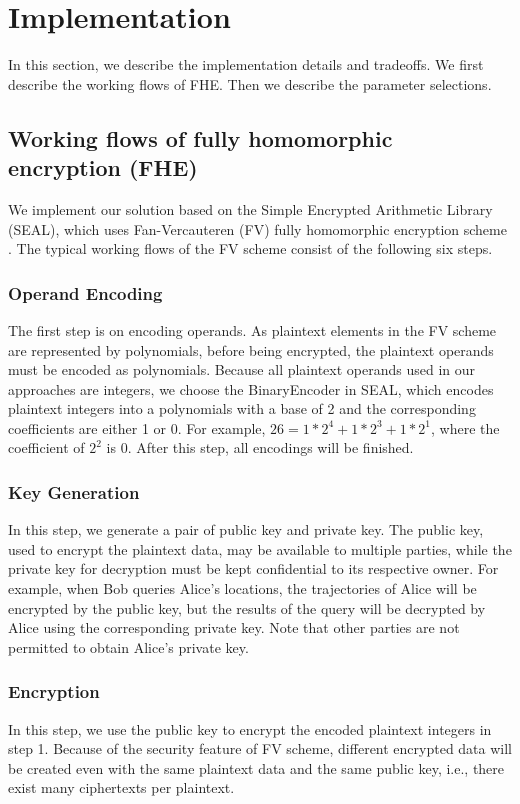 \section{Implementation}
\label{sec:implementation}

In this section, we describe the implementation details and tradeoffs. We first describe the working flows of FHE. Then we describe the parameter selections.

\subsection{Working flows of fully homomorphic encryption (FHE)}

We implement our solution based on the Simple Encrypted Arithmetic Library (SEAL), which uses Fan-Vercauteren (FV) fully homomorphic encryption scheme \cite{fan2012somewhat}. The typical working flows of the FV scheme consist of the following six steps.

\subsubsection{Operand Encoding}

The first step is on encoding operands. As plaintext elements in the FV scheme are represented by polynomials, before being encrypted, the plaintext operands must be encoded as polynomials. Because all plaintext operands used in our approaches are integers, we choose the BinaryEncoder in SEAL, which encodes plaintext integers into a polynomials with a base of 2 and the corresponding coefficients are either 1 or 0.  For example, $26 = 1*2^{4} + 1*2^{3} + 1*2^{1}$, where the coefficient of $2^2$ is 0. After this step, all encodings will be finished.

\subsubsection{Key Generation}
In this step, we generate a pair of public key and private key. The public key, used to encrypt the plaintext data, may be available to multiple parties, while the private key for decryption must be kept confidential to its respective owner. For example, when Bob queries Alice's locations, the trajectories of Alice will be encrypted by the public key, but the results of the query will be decrypted by Alice using the corresponding private key. Note that other parties are not permitted to obtain Alice's private key.

\subsubsection{Encryption}
In this step, we use the public key to encrypt the encoded plaintext integers in step 1. Because of the security feature of FV scheme, different encrypted data will be created even with the same plaintext data and the same public key, i.e., there exist many ciphertexts per plaintext.


